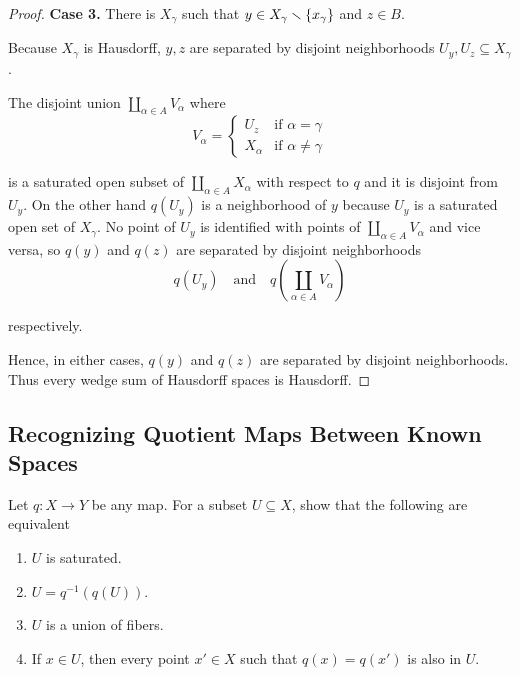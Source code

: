 \begin{proof}
	\textbf{Case 3.} There is $X_{\gamma}$ such that $y\in X_{\gamma}\smallsetminus\left\{{x_{\gamma}}\right\}$ and $z\in B$.

	Because $X_{\gamma}$ is Hausdorff, $y, z$ are separated by disjoint neighborhoods $U_{y}, U_{z} \subseteq X_{\gamma}$.

	The disjoint union $\coprod_{\alpha\in A} V_{\alpha}$ where
	\begin{equation*}
		V_{\alpha} = \begin{cases}
			U_{z}      & \text{if $\alpha = \gamma$}   \\
			X_{\alpha} & \text{if $\alpha \ne \gamma$}
		\end{cases}
	\end{equation*}

	is a saturated open subset of $\coprod_{\alpha\in A}X_{\alpha}$ with respect to $q$ and it is disjoint from $U_{y}$. On the other hand $q(U_{y})$ is a neighborhood of $y$ because $U_{y}$ is a saturated open set of $X_{\gamma}$. No point of $U_{y}$ is identified with points of $\coprod_{\alpha\in A} V_{\alpha}$ and vice versa, so $q(y)$ and $q(z)$ are separated by disjoint neighborhoods
	\begin{equation*}
		q(U_{y}) \quad\text{and}\quad q\left(\coprod_{\alpha\in A} V_{\alpha}\right)
	\end{equation*}

	respectively.

	Hence, in either cases, $q(y)$ and $q(z)$ are separated by disjoint neighborhoods. Thus every wedge sum of Hausdorff spaces is Hausdorff.
\end{proof}

\subsection*{Recognizing Quotient Maps Between Known Spaces}

\begin{exercise}{3.59}\label{exercise:3.59}
	Let $q: X\to Y$ be any map. For a subset $U\subseteq X$, show that the following are equivalent
	\begin{enumerate}[label={(\alph*)}]
		\item $U$ is saturated.
		\item $U = q^{-1}(q(U))$.
		\item $U$ is a union of fibers.
		\item If $x\in U$, then every point $x'\in X$ such that $q(x) = q(x')$ is also in $U$.
	\end{enumerate}
\end{exercise}

